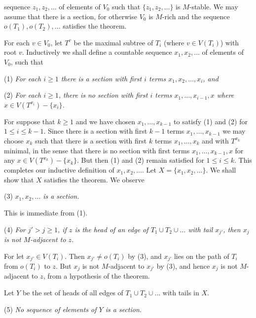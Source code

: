 \noindent sequence $z_1, z_2, \dots$ of elements of $V_0$ such that $\{z_1, z_2, \dots\}$ is $M$-stable. We may assume that there is a section, for otherwise $V_0$ is $M$-rich and the sequence $o(T_1), o(T_2), \dots$ satisfies the theorem.

For each $v \in V_0$, let $T^v$ be the maximal subtree of $T_i$ (where $v \in V(T_i)$) with root $v$. Inductively we shall define a countable sequence $x_1, x_2, \dots$ of elements of $V_0$, such that

\hspace*{12pt}(1) \textit{For each $i \ge 1$ there is a section with first $i$ terms $x_1, x_2, \dots, x_i$, and}

\hspace*{12pt}(2) \textit{For each $i \ge 1$, there is no section with first $i$ terms $x_1, \dots, x_{i-1}, x$ where $x \in V(T^{x_i}) - \{x_i\}$.}

For suppose that $k \ge 1$ and we have chosen $x_1, \dots, x_{k-1}$ to satisfy (1) and (2) for $1 \le i \le k-1$. Since there is a section with first $k-1$ terms $x_1, \dots, x_{k-1}$ we may choose $x_k$ such that there is a section with first $k$ terms $x_1, \dots, x_k$ and with $T^{x_k}$ minimal, in the sense that there is no section with first terms $x_1, \dots, x_{k-1}, x$ for any $x \in V(T^{x_k}) - \{x_k\}$. But then (1) and (2) remain satisfied for $1 \le i \le k$. This completes our inductive definition of $x_1, x_2, \dots$. Let $X = \{x_1, x_2, \dots\}$. We shall show that $X$ satisfies the theorem. We observe

\hspace*{12pt}(3) \textit{$x_1, x_2, \dots$ is a section.}

This is immediate from (1).

\hspace*{12pt}(4) \textit{For $j' > j \ge 1$, if $z$ is the head of an edge of $T_1 \cup T_2 \cup \dots$ with tail $x_{j'}$, then $x_j$ is not $M$-adjacent to $z$.}

For let $x_{j'} \in V(T_i)$. Then $x_{j'} \ne o(T_i)$ by (3), and $x_{j'}$ lies on the path of $T_i$ from $o(T_i)$ to $z$. But $x_j$ is not $M$-adjacent to $x_{j'}$ by (3), and hence $x_j$ is not $M$-adjacent to $z$, from a hypothesis of the theorem.

Let $Y$ be the set of heads of all edges of $T_1 \cup T_2 \cup \dots$ with tails in $X$.

\hspace*{12pt}(5) \textit{No sequence of elements of $Y$ is a section.}

